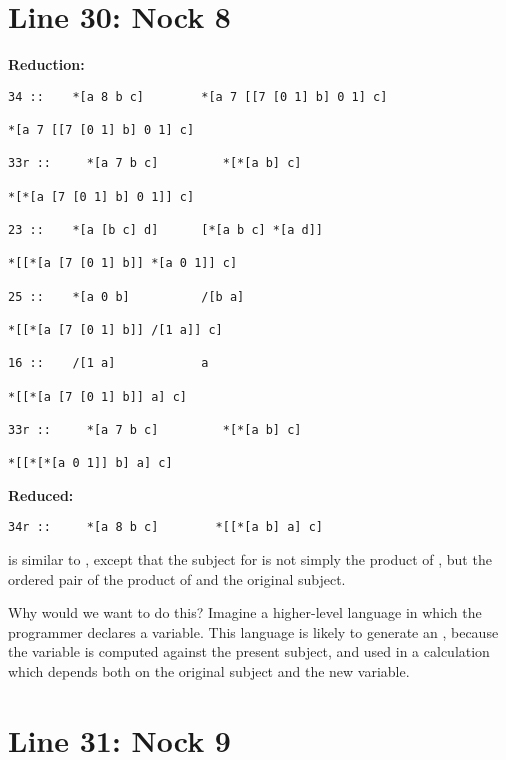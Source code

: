 \section{Line 30: Nock 8}

\textbf{ Reduction:}

\begin{framed_shaded}
\begin{Verbatim}[fontsize=\relsize{-2.5},fontseries=b,commandchars=\\\{\}]
34 ::    *[a 8 b c]        *[a 7 [[7 [0 1] b] 0 1] c]

*[a 7 [[7 [0 1] b] 0 1] c]   

33r ::     *[a 7 b c]         *[*[a b] c]

*[*[a [7 [0 1] b] 0 1]] c]

23 ::    *[a [b c] d]      [*[a b c] *[a d]]

*[[*[a [7 [0 1] b]] *[a 0 1]] c]

25 ::    *[a 0 b]          /[b a]

*[[*[a [7 [0 1] b]] /[1 a]] c]

16 ::    /[1 a]            a

*[[*[a [7 [0 1] b]] a] c]

33r ::     *[a 7 b c]         *[*[a b] c]

*[[*[*[a 0 1]] b] a] c]
\end{Verbatim}
\end{framed_shaded}
\textbf{ Reduced:}

\begin{framed_shaded}
\begin{Verbatim}[fontsize=\relsize{-2.5},fontseries=b,commandchars=\\\{\}]
34r ::     *[a 8 b c]        *[[*[a b] a] c]
\end{Verbatim}
\end{framed_shaded}
  is similar to , except that the subject for  is not simply the
 product of , but the ordered pair of the product of  and the original
 subject. 

Why would we want to do this?  Imagine a higher-level language in which the
programmer declares a variable.  This language is likely to generate an ,
because the variable is computed against the present subject, and used in a
calculation which depends both on the original subject and the new variable.

\section{Line 31: Nock 9}

